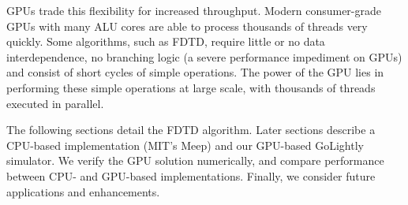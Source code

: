 GPUs trade this flexibility for increased throughput. Modern consumer-grade GPUs with many ALU cores are able to process thousands of threads very quickly. Some algorithms, such as FDTD, require little or no data interdependence, no branching logic (a severe performance impediment on GPUs) and consist of short cycles of simple operations. The power of the GPU lies in performing these simple operations at large scale, with thousands of threads executed in parallel. 

The following sections detail the FDTD algorithm. Later sections describe a CPU-based implementation (MIT's  Meep) and our GPU-based GoLightly simulator. We verify the GPU solution numerically, and compare performance between CPU- and GPU-based implementations. Finally, we consider future applications and enhancements. 

